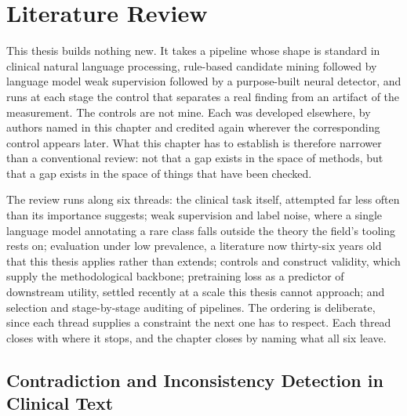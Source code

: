 %
%

\chapter{Literature Review}
\label{ch:lit}

This thesis builds nothing new. It takes a pipeline whose shape is standard in clinical
natural language processing, rule-based candidate mining followed by language model weak
supervision followed by a purpose-built neural detector, and runs at each stage the control
that separates a real finding from an artifact of the measurement. The controls are not
mine. Each was developed elsewhere, by authors named in this chapter and credited again
wherever the corresponding control appears later. What this chapter has to establish is
therefore narrower than a conventional review: not that a gap exists in the space of
methods, but that a gap exists in the space of things that have been checked.

The review runs along six threads: the clinical task itself, attempted far less often than
its importance suggests; weak supervision and label noise, where a single language model
annotating a rare class falls outside the theory the field's tooling rests on; evaluation
under low prevalence, a literature now thirty-six years old that this thesis applies rather
than extends; controls and construct validity, which supply the methodological backbone;
pretraining loss as a predictor of downstream utility, settled recently at a scale this
thesis cannot approach; and selection and stage-by-stage auditing of pipelines. The ordering
is deliberate, since each thread supplies a constraint the next one has to respect. Each
thread closes with where it stops, and the chapter closes by naming what all six leave.

\section{Contradiction and Inconsistency Detection in Clinical Text}
\label{sec:lit-contradiction}

